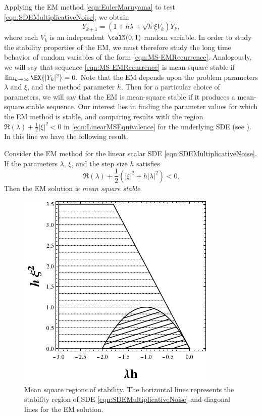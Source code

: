 			Applying the EM method \eqref{eqn:EulerMaruyama} to test \eqref{eqn:SDEMultiplicativeNoise}, we obtain
		\begin{equation}\label{eqn:MS-EMRecurrence}
			Y_{k+1} = \left(1 + h\lambda + \sqrt{h}\xi V_k\right)Y_k,
		\end{equation}
		where each $V_k$ is an independent $\calN(0,1)$ random variable. 
		In order to study the stability properties of the EM, we must therefore study
		the long time behavior of random variables of the form \eqref{eqn:MS-EMRecurrence}.
		Analogously, we will say that sequence \eqref{eqn:MS-EMRecurrence} is mean-square stable if 
		$
			\lim_{k \to  \infty}
				\EX{|Y_k|^2} = 0.
		$
		Note that the EM depends upon the problem parameters $\lambda$ and  $\xi$, and the method
		parameter $h$. Then for a particular choice of parameters, we will say that the EM is mean-square stable 
		if it produces a mean-square stable sequence. 
		Our interest lies in finding the parameter values for which the EM method is stable, and comparing results
		with the region $\Re(\lambda) + \frac{1}{2}|\xi|^2 < 0$ in \eqref{eqn:LinearMSEquivalence}
		for the underlying SDE (see ). In this line we have the following 
		result. 
		\begin{thm}
			Consider the EM method for the linear scalar SDE \eqref{eqn:SDEMultiplicativeNoise}. If the parameters 
			$\lambda$, $\xi$, and the step size $h$ satisfies
			$$
				\Re(\lambda) + \frac{1}{2}
				\left( |\xi|^2 + h|\lambda|^2\right) <0.
			$$
			Then the EM solution is \emph{mean square stable}.
		\end{thm}
		
		\begin{figure}[htb]
			\centering
			\includegraphics[scale=0.6]{Preliminaries/figures/StabilityPlotsMultiplicativeEM.png}
			\caption{Mean square regions of stability. The horizontal lines represents the stability region of
				SDE \eqref{eqn:SDEMultiplicativeNoise} and diagonal lines for the EM solution.
			}
			\label{fig:StabilityPlotsMultiplicativeEM}
		\end{figure}
			
